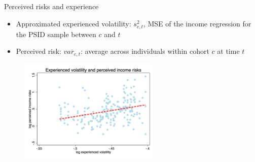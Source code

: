 \documentclass{beamer}
\begin{document}

\begin{frame}{Perceived risks and experience}
	\begin{itemize}
		\item Approximated experienced volatility: $s^2_{c,t}$, MSE of the income regression for the PSID sample between $c$ and $t$ 
		\item Perceived risk: $\overline{var_{c,t}}$: average across individuals within cohort $c$ at time $t$
	\end{itemize}
	\begin{figure}[ht]
		\label{ts_incvar_byear_g_mean}
		\centering
		\includegraphics[width=0.6\textwidth]{figures/experience_var_var_data.png}
	\end{figure}
\end{frame}
\end{document}
